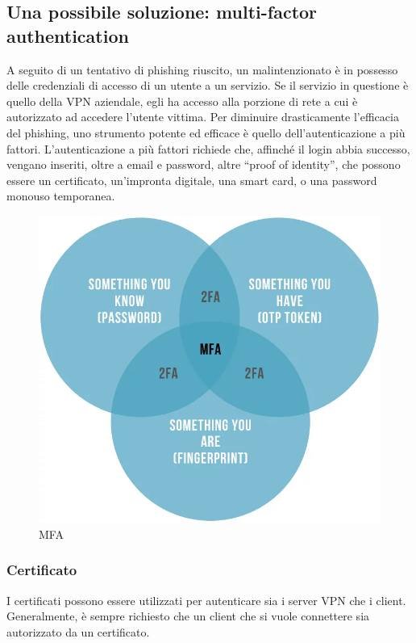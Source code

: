 \subsection{Una possibile soluzione: multi-factor authentication}
A seguito di un tentativo di phishing riuscito, un malintenzionato è in possesso delle credenziali di accesso di un utente a un servizio. Se il servizio in questione è quello della VPN aziendale, egli ha accesso alla porzione di rete a cui è autorizzato ad accedere l'utente vittima.
Per diminuire drasticamente l'efficacia del phishing, uno strumento potente ed efficace è quello dell'autenticazione a più fattori.
L'autenticazione a più fattori richiede che, affinché il login abbia successo, vengano inseriti, oltre a email e password, altre ``proof of identity'', che possono essere un certificato, un'impronta digitale, una smart card, o una password monouso temporanea.

\begin{figure}[ht]
    \centering
    \includegraphics[width=12cm]{figure/mfa.jpeg}
    \caption{MFA}
\end{figure}

\subsubsection{Certificato}

I certificati possono essere utilizzati per autenticare sia i server VPN che i client. Generalmente, è sempre richiesto che un client che si vuole connettere sia autorizzato da un certificato.

